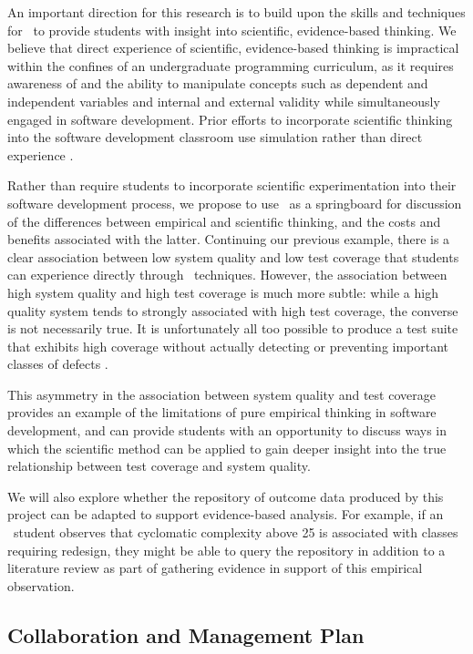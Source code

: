 An important direction for this research is to build upon the skills and
techniques for \eCT\ to provide students with insight into scientific,
evidence-based thinking.  We believe that direct experience of
scientific, evidence-based thinking is impractical within the confines of
an undergraduate programming curriculum, as it requires awareness of and
the ability to manipulate concepts such as dependent and independent
variables and internal and external validity while simultaneously engaged
in software development. Prior efforts to incorporate scientific thinking into
the software development classroom use simulation rather than direct experience \citep{Host02}.

Rather than require students to incorporate scientific experimentation into
their software development process, we propose to use \eCT\ as a
springboard for discussion of the differences between empirical and
scientific thinking, and the costs and benefits associated with the latter.
Continuing our previous example, there is a clear association between low
system quality and low test coverage that students can experience directly
through \eCT\ techniques.  However, the association between high system
quality and high test coverage is much more subtle: while a high quality
system tends to strongly associated with high test coverage, the converse
is not necessarily true. It is unfortunately all too possible to produce a
test suite that exhibits high coverage without actually detecting or
preventing important classes of defects \citep{Marick99}.

This asymmetry in the association between system quality and test coverage
provides an example of the limitations of pure empirical thinking in
software development, and can provide students with an opportunity to discuss 
ways in which the scientific method can be applied to gain deeper insight into 
the true relationship between test coverage and system quality.  

We will also explore whether the repository of outcome data produced by
this project can be adapted to support evidence-based analysis. For
example, if an \eCT\ student observes that cyclomatic complexity above 25
is associated with classes requiring redesign, they might be able to query
the repository in addition to a literature review as part of gathering
evidence in support of this empirical observation.


\subsection{Collaboration and Management Plan}

